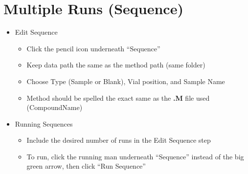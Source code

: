 \documentclass[letterpaper,11pt]{article}
\begin{document}
\section{Multiple Runs (Sequence)}
	\begin{itemize}
	\item Edit Sequence
    	\begin{itemize}
    	\item Click the pencil icon underneath ``Sequence''
        \item Keep data path the same as the method path (same folder)
        \item Choose Type (Sample or Blank), Vial position, and Sample Name
        \item Method should be spelled the exact same as the \textbf{.M} file used (CompoundName)      
    	\end{itemize}
    \item Running Sequences
    	\begin{itemize}
    	\item Include the desired number of runs in the Edit Sequence step
        \item To run, click the running man underneath ``Sequence'' instead of the big green arrow, then click ``Run Sequence''
    	\end{itemize}
	\end{itemize}
    
\end{document}

